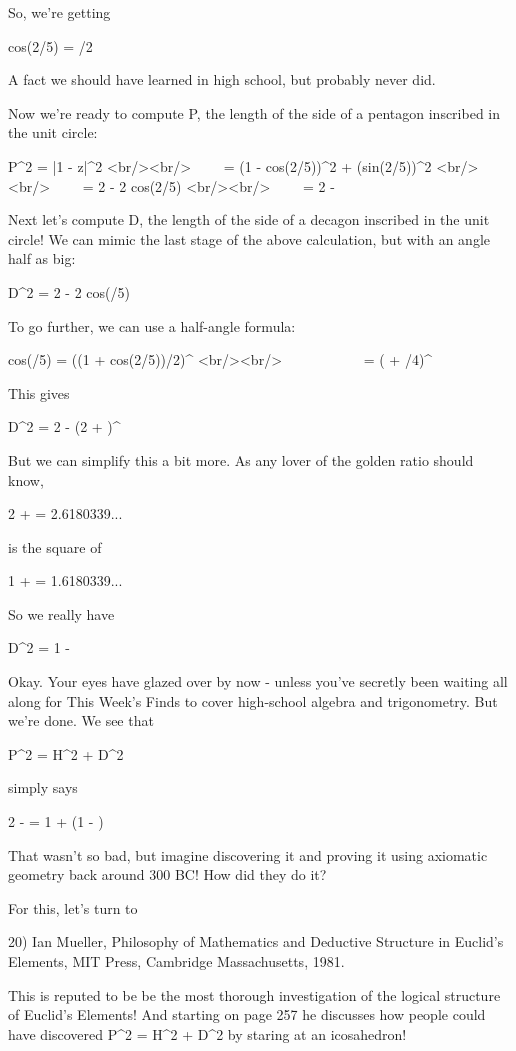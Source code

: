 So, we're getting

cos(2\pi /5) = \phi /2

A fact we should have learned in high school, but probably never did.

Now we're ready to compute P, the length of the side of a pentagon
inscribed in the unit circle:

P^{2} = |1 - z|^{2}   <br/><br/>
\ \ \ \   = (1 - cos(2\pi /5))^{2} + (sin(2\pi /5))^{2}   <br/><br/>
\ \ \ \     = 2 - 2 cos(2\pi /5)   <br/><br/>
\ \ \ \      = 2 - \phi 

Next let's compute D, the length of the side of a decagon inscribed
in the unit circle!   We can mimic the last stage of the above 
calculation, but with an angle half as big:

D^{2} = 2 - 2 cos(\pi /5)

To go further, we can use a half-angle formula:

cos(\pi /5) = ((1 + cos(2\pi /5))/2)^{ } <br/><br/>
\ \ \ \ \ \ \ \ \ \ \    = (  + \phi /4)^{ }

This gives

D^{2} = 2 - (2 + \phi )^{ }

But we can simplify this a bit more.  As any lover of the golden ratio 
should know, 

2 + \phi  = 2.6180339...

is the square of 

1 + \phi  = 1.6180339...

So we really have

D^{2} = 1 - \phi 

Okay.  Your eyes have glazed over by now - unless you've secretly been
waiting all along for This Week's Finds to cover high-school algebra
and trigonometry.  But we're done.  We see that

P^{2} = H^{2} + D^{2}

simply says

2 - \phi  = 1 + (1 - \phi )

That wasn't so bad, but imagine discovering it and proving it using 
axiomatic geometry back around 300 BC!  How did they do it?

For this, let's turn to

20) Ian Mueller, Philosophy of Mathematics and Deductive Structure in 
Euclid's Elements, MIT Press, Cambridge Massachusetts, 1981.

This is reputed to be be the most thorough investigation of the 
logical structure of Euclid's Elements!  And starting on page 257 he
discusses how people could have discovered P^{2} = 
H^{2} + D^{2} by staring at
an icosahedron!  

